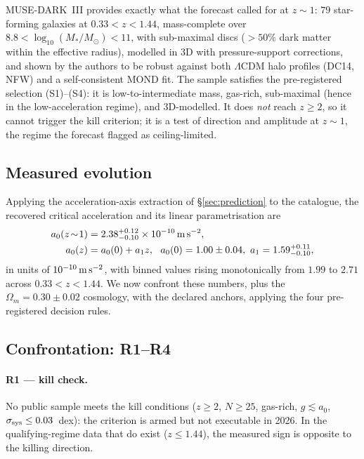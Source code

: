 \documentclass[fleqn,usenatbib]{mnras}
\newcommand{\azero}{a_0}
\newcommand{\ssys}{\sigma_{\rm sys}}
\begin{document}
MUSE-DARK~III \citep{Ciocan2026} provides exactly what the forecast called for at
$z\sim1$: $79$ star-forming galaxies at $0.33<z<1.44$, mass-complete over
$8.8<\log_{10}(M_*/M_\odot)<11$, with sub-maximal discs ($>50\%$ dark matter within
the effective radius), modelled in 3D with pressure-support corrections, and shown by
the authors to be robust against both $\Lambda$CDM halo profiles (DC14, NFW) and a
self-consistent MOND fit. The sample satisfies the pre-registered selection
(S1)--(S4): it is low-to-intermediate mass, gas-rich, sub-maximal (hence in the
low-acceleration regime), and 3D-modelled. It does \emph{not} reach $z\ge2$, so it
cannot trigger the kill criterion; it is a test of direction and amplitude at
$z\sim1$, the regime the forecast flagged as ceiling-limited.

\subsection{Measured evolution}\label{sec:measured}

Applying the acceleration-axis extraction of \S\ref{sec:prediction} to the
catalogue, the recovered critical acceleration and its linear parametrisation are
\begin{align}
\azero(z\!\sim\!1) &= 2.38^{+0.12}_{-0.10}\times10^{-10}\,{\rm m\,s^{-2}},
\label{eq:meas1}\\
\azero(z) &= \azero(0)+a_1 z,\ \
\azero(0)=1.00\pm0.04,\ a_1=1.59^{+0.11}_{-0.10},
\label{eq:meas2}
\end{align}
in units of $10^{-10}\,{\rm m\,s^{-2}}$, with binned values rising monotonically
from $1.99$ to $2.71$ across $0.33<z<1.44$. We now confront these numbers, plus the
$\Omega_m=0.30\pm0.02$ cosmology, with the declared anchors, applying the four
pre-registered decision rules.

\subsection{Confrontation: R1--R4}\label{sec:confront}

\paragraph{R1 --- kill check.} No public sample meets the kill conditions ($z\ge2$,
$N\ge25$, gas-rich, $g\lesssim\azero$, $\ssys\le0.03$~dex): the criterion is armed
but not executable in 2026. In the qualifying-regime data that do exist
($z\le1.44$), the measured sign is opposite to the killing direction.
\end{document}
